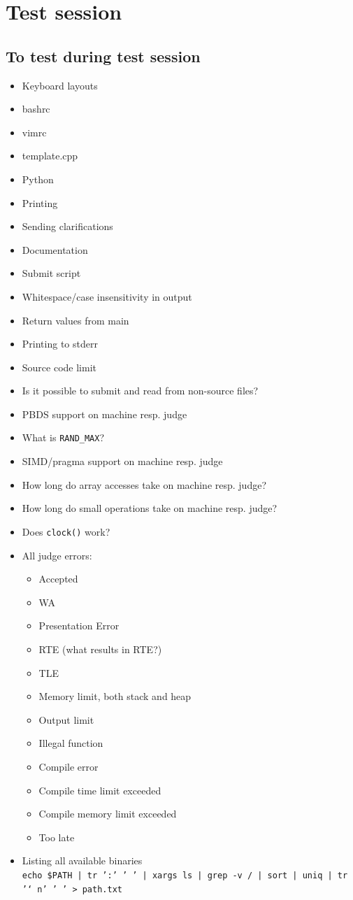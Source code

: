 \appendix
\chapter{Test session}

\section{To test during test session}
\begin{itemize}
	\item Keyboard layouts
	\item bashrc
	\item vimrc
	\item template.cpp
	\item Python
	\item Printing
	\item Sending clarifications
	\item Documentation
	\item Submit script
	\item Whitespace/case insensitivity in output
	\item Return values from main
	\item Printing to stderr
	\item Source code limit
	\item Is it possible to submit and read from non-source files?
  \item PBDS support on machine resp. judge
  \item What is \texttt{RAND\_MAX}?
	\item SIMD/pragma support on machine resp. judge
	\item How long do array accesses take on machine resp. judge?
	\item How long do small operations take on machine resp. judge?
	\item Does \texttt{clock()} work?
	\item All judge errors:
		\begin{itemize}
			\item Accepted
			\item WA
			\item Presentation Error
			\item RTE (what results in RTE?)
			\item TLE
			\item Memory limit, both stack and heap
			\item Output limit
			\item Illegal function
			\item Compile error
			\item Compile time limit exceeded
			\item Compile memory limit exceeded
			\item Too late
		\end{itemize}
	\item Listing all available binaries\\
		\texttt{echo \$PATH | tr ':' ' ' | xargs ls | grep -v / | sort | uniq | tr '\char`\\n' ' ' > path.txt}
\end{itemize}
